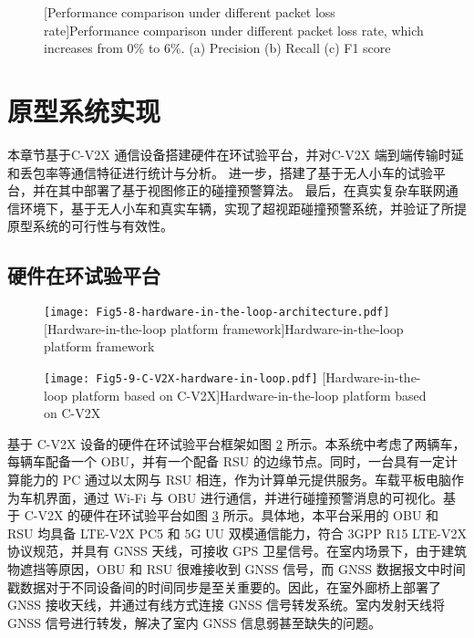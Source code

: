 \begin{figure}[h]
     \centering
     [Performance comparison under different packet loss rate]{Performance comparison under different packet loss rate, which increases from 0\% to 6\%. (a) Precision (b) Recall (c) F1 score}
     \label{fig 5-6}
\end{figure}

\section{原型系统实现}\label{section 5-5}

本章节基于C-V2X 通信设备搭建硬件在环试验平台，并对C-V2X 端到端传输时延和丢包率等通信特征进行统计与分析。
进一步，搭建了基于无人小车的试验平台，并在其中部署了基于视图修正的碰撞预警算法。
最后，在真实复杂车联网通信环境下，基于无人小车和真实车辆，实现了超视距碰撞预警系统，并验证了所提原型系统的可行性与有效性。

\subsection{硬件在环试验平台}

\begin{figure}[h]
\centering
  \texttt{[image: Fig5-8-hardware-in-the-loop-architecture.pdf]}
  [Hardware-in-the-loop platform framework]{Hardware-in-the-loop platform framework}
  \label{fig 5-7}
\end{figure}

\begin{figure}[h]
\centering
  \texttt{[image: Fig5-9-C-V2X-hardware-in-loop.pdf]}
  [Hardware-in-the-loop platform based on C-V2X]{Hardware-in-the-loop platform based on C-V2X}
  \label{fig 5-8}
\end{figure}

基于 C-V2X 设备的硬件在环试验平台框架如图 \ref{fig 5-7} 所示。本系统中考虑了两辆车，每辆车配备一个 OBU，并有一个配备 RSU 的边缘节点。同时，一台具有一定计算能力的 PC 通过以太网与 RSU 相连，作为计算单元提供服务。车载平板电脑作为车机界面，通过 Wi-Fi 与 OBU 进行通信，并进行碰撞预警消息的可视化。基于 C-V2X 的硬件在环试验平台如图 \ref{fig 5-8} 所示。具体地，本平台采用的 OBU 和 RSU 均具备 LTE-V2X PC5 和 5G UU 双模通信能力，符合 3GPP R15 LTE-V2X 协议规范，并具有 GNSS 天线，可接收 GPS 卫星信号。在室内场景下，由于建筑物遮挡等原因，OBU 和 RSU 很难接收到 GNSS 信号，而 GNSS 数据报文中时间戳数据对于不同设备间的时间同步是至关重要的。因此，在室外廊桥上部署了 GNSS 接收天线，并通过有线方式连接 GNSS 信号转发系统。室内发射天线将 GNSS 信号进行转发，解决了室内 GNSS 信息弱甚至缺失的问题。

